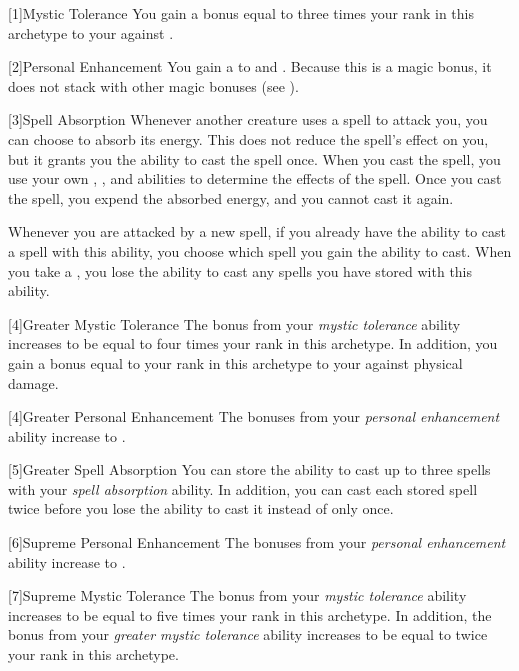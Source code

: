         [1]{Mystic Tolerance} You gain a bonus equal to three times your rank in this archetype to your  against .

        [2]{Personal Enhancement} You gain a   to  and .
        Because this is a magic bonus, it does not stack with other magic bonuses (see ).

        [3]{Spell Absorption} Whenever another creature uses a spell to attack you, you can choose to absorb its energy.
        This does not reduce the spell's effect on you, but it grants you the ability to cast the spell once.
        When you cast the spell, you use your own , , and abilities to determine the effects of the spell.
        Once you cast the spell, you expend the absorbed energy, and you cannot cast it again.

        Whenever you are attacked by a new spell, if you already have the ability to cast a spell with this ability, you choose which spell you gain the ability to cast.
        When you take a , you lose the ability to cast any spells you have stored with this ability.

        [4]{Greater Mystic Tolerance} The bonus from your \textit{mystic tolerance} ability increases to be equal to four times your rank in this archetype.
        In addition, you gain a bonus equal to your rank in this archetype to your  against physical damage.

        [4]{Greater Personal Enhancement} The bonuses from your \textit{personal enhancement} ability increase to .

        [5]{Greater Spell Absorption} You can store the ability to cast up to three spells with your \textit{spell absorption} ability.
        In addition, you can cast each stored spell twice before you lose the ability to cast it instead of only once.

        [6]{Supreme Personal Enhancement} The bonuses from your \textit{personal enhancement} ability increase to .

        [7]{Supreme Mystic Tolerance} The bonus from your \textit{mystic tolerance} ability increases to be equal to five times your rank in this archetype.
        In addition, the bonus from your \textit{greater mystic tolerance} ability increases to be equal to twice your rank in this archetype.

